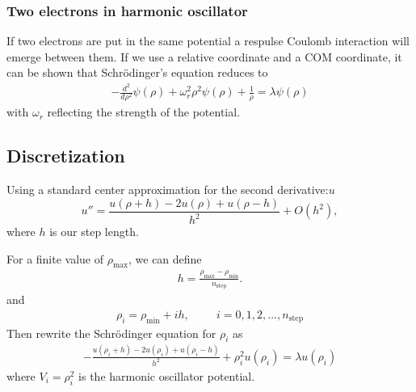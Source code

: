 \documentclass[11pt,a4paper,english,draft]{article}
\numberwithin{equation}{section}
\begin{document}
 \subsubsection{Two electrons in harmonic oscillator}
If two electrons are put in the same potential a respulse Coulomb 
interaction will emerge between them. If we use a relative coordinate
and a COM coordinate, it can be shown that Schrödinger's equation
reduces to
\begin{gather}
 -\frac{d^2}{d\rho^2} \psi(\rho) + \omega_r^2\rho^2\psi(\rho) 
 +\frac{1}{\rho} = \lambda \psi(\rho)
\end{gather}
with $\omega_r$ reflecting the strength of the potential. 

 
 
 
\subsection{Discretization}

Using a standard center approximation for the second derivative:$u$
\begin{equation}
    u''=\frac{u(\rho+h) -2u(\rho) +u(\rho-h)}{h^2} +O(h^2),
    \label{eq:diffoperation}
\end{equation} 
where $h$ is our step length.

For a finite value of $\rho_{\mathrm{max}}$, we can define 
\begin{gather}
  h=\frac{\rho_{\mathrm{max}}-\rho_{\mathrm{min}} }{n_{\mathrm{step}}}.
\end{gather}
and 
\begin{gather}
    \rho_i= \rho_{\mathrm{min}} + ih, \hspace{1cm} i=0,1,2,\dots ,
    n_{\mathrm{step}}
\end{gather}
Then rewrite the Schrödinger equation for $\rho_i$ as
\begin{gather}
-\frac{u(\rho_i+h) -2u(\rho_i) +u(\rho_i-h)}{h^2}+\rho_i^2u(\rho_i) 
= \lambda u(\rho_i)
\end{gather}
where $V_i=\rho_i^2$ is the harmonic oscillator potential.
\end{document}
